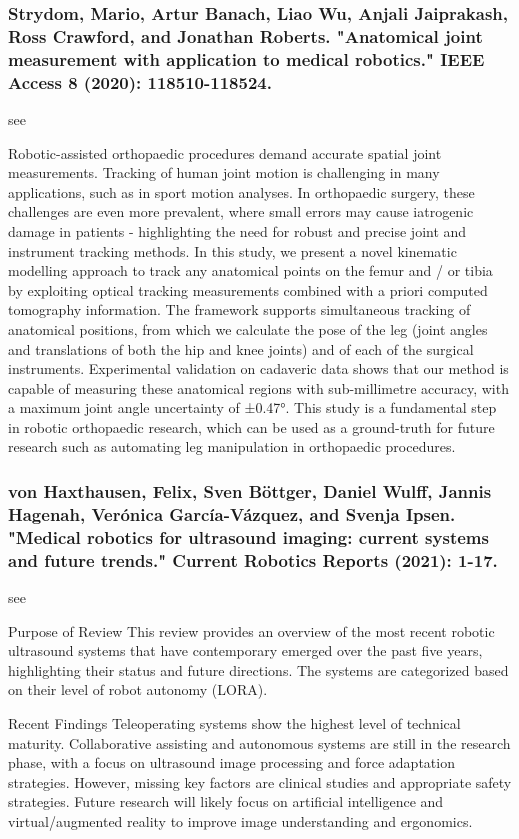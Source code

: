 \documentclass[conference]{IEEEtran}
\begin{document}
\medskip
\subsubsection{Strydom, Mario, Artur Banach, Liao Wu, Anjali Jaiprakash, Ross Crawford, and Jonathan Roberts. "Anatomical joint measurement with application to medical robotics." IEEE Access 8 (2020): 118510-118524.}
see \cite{strydom2020anatomical}

Robotic-assisted orthopaedic procedures demand accurate spatial joint measurements. Tracking of human joint motion is challenging in many applications, such as in sport motion analyses. In orthopaedic surgery, these challenges are even more prevalent, where small errors may cause iatrogenic damage in patients - highlighting the need for robust and precise joint and instrument tracking methods. In this study, we present a novel kinematic modelling approach to track any anatomical points on the femur and / or tibia by exploiting optical tracking measurements combined with a priori computed tomography information. The framework supports simultaneous tracking of anatomical positions, from which we calculate the pose of the leg (joint angles and translations of both the hip and knee joints) and of each of the surgical instruments. Experimental validation on cadaveric data shows that our method is capable of measuring these anatomical regions with sub-millimetre accuracy, with a maximum joint angle uncertainty of ±0.47°. This study is a fundamental step in robotic orthopaedic research, which can be used as a ground-truth for future research such as automating leg manipulation in orthopaedic procedures.

\medskip
\subsubsection{von Haxthausen, Felix, Sven Böttger, Daniel Wulff, Jannis Hagenah, Verónica García-Vázquez, and Svenja Ipsen. "Medical robotics for ultrasound imaging: current systems and future trends." Current Robotics Reports (2021): 1-17.}
see \cite{von2021medical}

Purpose of Review
This review provides an overview of the most recent robotic ultrasound systems that have contemporary emerged over the past five years, highlighting their status and future directions. The systems are categorized based on their level of robot autonomy (LORA).

Recent Findings
Teleoperating systems show the highest level of technical maturity. Collaborative assisting and autonomous systems are still in the research phase, with a focus on ultrasound image processing and force adaptation strategies. However, missing key factors are clinical studies and appropriate safety strategies. Future research will likely focus on artificial intelligence and virtual/augmented reality to improve image understanding and ergonomics.
\end{document}
